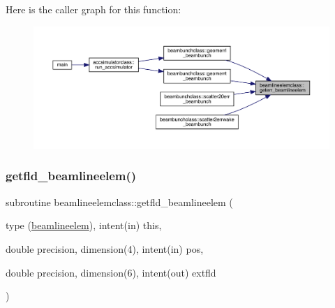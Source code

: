 Here is the caller graph for this function\+:\nopagebreak
\begin{figure}[H]
\begin{center}
\leavevmode
\includegraphics[width=350pt]{namespacebeamlineelemclass_aa02696ccb3d6d48bfdcb0ff3ea906fa1_icgraph}
\end{center}
\end{figure}
\mbox{\label{namespacebeamlineelemclass_a21fd373bab34a4c18c8bcf5b00816c0c}} 
\subsubsection{\texorpdfstring{getfld\_beamlineelem()}{getfld\_beamlineelem()}}
{\footnotesize\ttfamily subroutine beamlineelemclass\+::getfld\+\_\+beamlineelem (\begin{DoxyParamCaption}\item[{type (\mbox{\hyperlink{namespacebeamlineelemclass_structbeamlineelemclass_1_1beamlineelem}{beamlineelem}}), intent(in)}]{this,  }\item[{double precision, dimension(4), intent(in)}]{pos,  }\item[{double precision, dimension(6), intent(out)}]{extfld }\end{DoxyParamCaption})}

